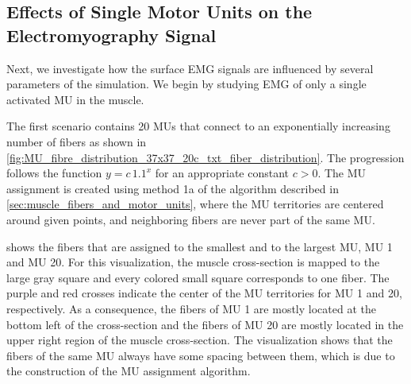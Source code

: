 \subsection{Effects of Single Motor Units on the Electromyography Signal}\label{sec:simfiber_mu}

Next, we investigate how the surface EMG signals are influenced by several parameters of the simulation. We begin by studying EMG of only a single activated MU in the muscle.

The first scenario contains 20 MUs that connect to an exponentially increasing number of fibers as shown in \cref{fig:MU_fibre_distribution_37x37_20c_txt_fiber_distribution}. The progression follows the function $y=c\,1.1^x$ for an appropriate constant $c>0$.
The MU assignment is created using method 1a of the algorithm described in \cref{sec:muscle_fibers_and_motor_units}, where the MU territories are centered around given points, and neighboring fibers are never part of the same MU. 

 shows the fibers that are assigned to the smallest and to the largest MU, MU 1 and MU 20. For this visualization, the muscle cross-section is mapped to the large gray square and every colored small square corresponds to one fiber. The purple and red crosses indicate the center of the MU territories for MU 1 and 20, respectively. As a consequence, the fibers of MU 1 are mostly located at the bottom left of the cross-section and the fibers of MU 20 are mostly located in the upper right region of the muscle cross-section.
The visualization shows that the fibers of the same MU always have some spacing between them, which is due to the construction of the MU assignment algorithm.
\newpage

